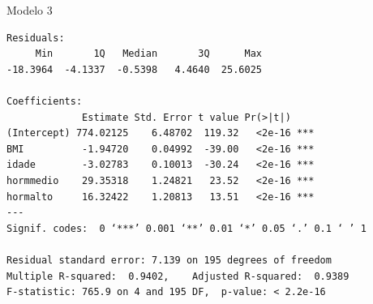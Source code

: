 \documentclass{beamer}
\begin{document}
\begin{frame}[fragile]{}
  \begin{center}
    \begin{exampleblock}{Modelo 3}
      \tiny
\begin{verbatim}
Residuals:
     Min       1Q   Median       3Q      Max 
-18.3964  -4.1337  -0.5398   4.4640  25.6025 

Coefficients:
             Estimate Std. Error t value Pr(>|t|)    
(Intercept) 774.02125    6.48702  119.32   <2e-16 ***
BMI          -1.94720    0.04992  -39.00   <2e-16 ***
idade        -3.02783    0.10013  -30.24   <2e-16 ***
hormmedio    29.35318    1.24821   23.52   <2e-16 ***
hormalto     16.32422    1.20813   13.51   <2e-16 ***
---
Signif. codes:  0 ‘***’ 0.001 ‘**’ 0.01 ‘*’ 0.05 ‘.’ 0.1 ‘ ’ 1

Residual standard error: 7.139 on 195 degrees of freedom
Multiple R-squared:  0.9402,	Adjusted R-squared:  0.9389 
F-statistic: 765.9 on 4 and 195 DF,  p-value: < 2.2e-16
\end{verbatim}
    \end{exampleblock}
  \end{center}
\end{frame}
\end{document}
